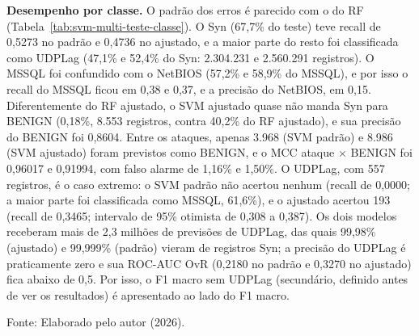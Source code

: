 \documentclass[
    12pt,                %
    openright,           %
    oneside,             %
    a4paper,             %
    english,             %
    brazil               %
]{abntex2}
\begin{document}
\textbf{Desempenho por classe.} O padrão dos erros é parecido com o do RF (Tabela~\ref{tab:svm-multi-teste-classe}). O Syn (67,7\% do teste) teve recall de 0,5273 no padrão e 0,4736 no ajustado, e a maior parte do resto foi classificada como UDPLag (47,1\% e 52,4\% do Syn: 2.304.231 e 2.560.291 registros). O MSSQL foi confundido com o NetBIOS (57,2\% e 58,9\% do MSSQL), e por isso o recall do MSSQL ficou em 0,38 e 0,37, e a precisão do NetBIOS, em 0,15. Diferentemente do RF ajustado, o SVM ajustado quase não manda Syn para BENIGN (0,18\%, 8.553 registros, contra 40,2\% do RF ajustado), e sua precisão do BENIGN foi 0,8604. Entre os ataques, apenas 3.968 (SVM padrão) e 8.986 (SVM ajustado) foram previstos como BENIGN, e o MCC ataque $\times$ BENIGN foi 0,96017 e 0,91994, com falso alarme de 1,16\% e 1,50\%. O UDPLag, com 557 registros, é o caso extremo: o SVM padrão não acertou nenhum (recall de 0,0000; a maior parte foi classificada como MSSQL, 61,6\%), e o ajustado acertou 193 (recall de 0,3465; intervalo de 95\% otimista de 0,308 a 0,387). Os dois modelos receberam mais de 2,3 milhões de previsões de UDPLag, das quais 99,98\% (ajustado) e 99,999\% (padrão) vieram de registros Syn; a precisão do UDPLag é praticamente zero e sua ROC-AUC OvR (0,2180 no padrão e 0,3270 no ajustado) fica abaixo de 0,5. Por isso, o F1 macro sem UDPLag (secundário, definido antes de ver os resultados) é apresentado ao lado do F1 macro.
 
\begin{table}
\centering
\caption{Desempenho dos SVMs multiclasse por classe no teste}
\label{tab:svm-multi-teste-classe}
\footnotesize
{}
\par\smallskip
Fonte: Elaborado pelo autor (2026).
\end{table}
 
\end{document}
